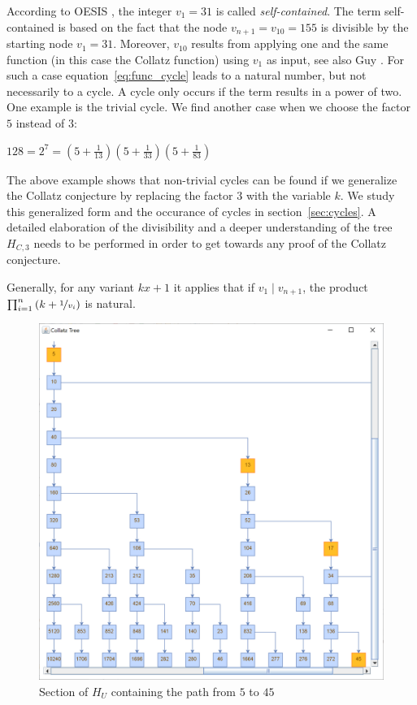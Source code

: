 According to OESIS \cite{Ref_OESIS}, the integer $v_1=31$ is called \textit{self-contained}. The term self-contained is based on the fact that the node $v_{n+1}=v_{10}=155$ is divisible by the starting node $v_1=31$. Moreover, $v_{10}$ results from applying one and the same function (in this case the Collatz function) using $v_1$ as input, see also Guy \cite[p.~332]{Ref_Guy}. For such a case equation~\ref{eq:func_cycle} leads to a natural number, but not necessarily to a cycle. A cycle only occurs if the term results in a power of two. One example is the trivial cycle. We find another case when we choose the factor $5$ instead of $3$:
\begin{center}
	$128=2^7=\left(5+\frac{1}{13}\right)\left(5+\frac{1}{33}\right)
	\left(5+\frac{1}{83}\right)$
\end{center}

The above example shows that non-trivial cycles can be found if we generalize the Collatz conjecture by replacing the factor $3$ with the variable $k$. We study this generalized form and the occurance of cycles in section~\ref{sec:cycles}. A detailed elaboration of the divisibility and a deeper understanding of the tree $H_{C,3}$ needs to be performed in order to get towards any proof of the Collatz conjecture.

Generally, for any variant $kx+1$ it applies that if $v_1\mid v_{n+1}$, the product $\prod_{i=1}^n\left(k+\nicefrac{1}{v_i}\right)$ is natural.

\newpage

\begin{figure}[H]
	\includegraphics[width=1.00\textwidth]{figures/h_u.png}
	\caption{Section of $H_U$ containing the path from $5$ to $45$}
	\label{fig:3}
\end{figure}

